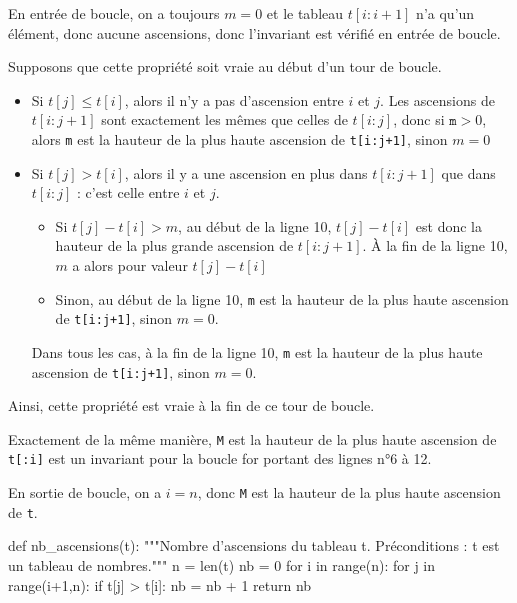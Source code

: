 \question{} En entrée de boucle, on a toujours $m=0$ et le tableau $t[i:i+1]$ n'a qu'un élément, donc aucune ascensions, donc l'invariant est vérifié en entrée de boucle. 

Supposons que cette propriété soit vraie au début d'un tour de boucle. 
\begin{itemize}
  \item Si $t[j]  \leq t[i]$, alors il n'y a pas d'ascension entre $i$ et $j$. Les ascensions de $t[i:j+1]$ sont exactement les mêmes que celles de $t[i:j]$, donc si $\texttt{m}>0$, alors \texttt{m} est la hauteur de la plus haute ascension de \texttt{t[i:j+1]}, sinon $m=0$ 
  \item Si $t[j]  > t[i]$, alors il y a une ascension en plus dans $t[i:j+1]$ que dans $t[i:j]$ : c'est celle entre $i$ et $j$. 
    \begin{itemize}
      \item[\textbullet] Si $t[j]-t[i] > m$, au début de la ligne 10, $t[j]-t[i]$ est donc la hauteur de la plus grande ascension de $t[i:j+1]$. À la fin de la ligne 10, $m$ a alors pour valeur  $t[j]-t[i]$
      \item[\textbullet] Sinon, au début de la ligne 10, \texttt{m} est la hauteur de la plus haute ascension de \texttt{t[i:j+1]}, sinon $m=0$.
    \end{itemize}
    Dans tous les cas, à la fin de la ligne 10, \texttt{m} est la hauteur de la plus haute ascension de \texttt{t[i:j+1]}, sinon $m=0$.
\end{itemize}
Ainsi, cette propriété est vraie à la fin de ce tour de boucle. 



\question{}
Exactement de la même manière, \og \texttt{M} est la hauteur de la plus haute ascension de \texttt{t[:i]} \fg{} est un invariant pour la boucle  for portant des lignes n°6 à 12.

En sortie de boucle, on a $i = n$, donc \texttt{M} est la hauteur de la plus haute ascension de \texttt{t}.



\question{}
\begin{pyverbatim}
def nb_ascensions(t):
    """Nombre d'ascensions du tableau t.
    Préconditions : t est un tableau de nombres."""
    n = len(t)
    nb = 0
    for i in range(n):
        for j in range(i+1,n):
            if t[j] > t[i]:
                nb = nb + 1
    return nb
\end{pyverbatim}
